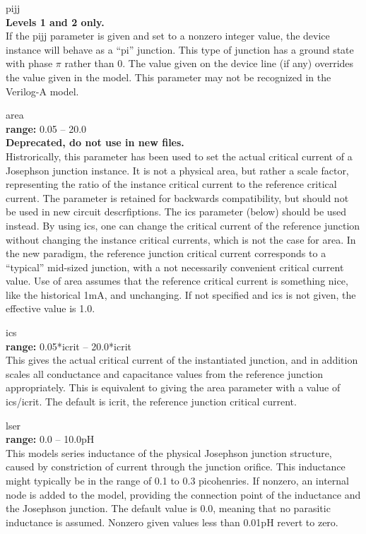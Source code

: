 \begin{description}
\item{\vt pijj}\\
{\bf Levels 1 and 2 only.}\\
If the {\vt pijj} parameter is given and set to a nonzero integer
value, the device instance will behave as a ``pi'' junction.  This
type of junction has a ground state with phase $\pi$ rather than 0. 
The value given on the device line (if any) overrides the value given
in the model.  This parameter may not be recognized in the Verilog-A
model.

\item{\vt area}\\
{\bf range:} 0.05 -- 20.0\\
{\bf Deprecated, do not use in new files.}\\
Histrorically, this parameter has been used to set the actual critical
current of a Josephson junction instance.  It is not a physical area,
but rather a scale factor, representing the ratio of the instance
critical current to the reference critical current.  The parameter is
retained for backwards compatibility, but should not be used in new
circuit descrfiptions.  The {\vt ics} parameter (below) should be used
instead.  By using {\vt ics}, one can change the critical current of
the reference junction without changing the instance critical
currents, which is not the case for {\vt area}.  In the new paradigm,
the reference junction critical current corresponds to a ``typical''
mid-sized junction, with a not necessarily convenient critical current
value.  Use of {\vt area} assumes that the reference critical current
is something nice, like the historical 1mA, and unchanging.  If not
specified and {\vt ics} is not given, the effective value is 1.0.

\item{\vt ics}\\
{\bf range:} 0.05*{\vt icrit} -- 20.0*{\vt icrit}\\
This gives the actual critical current of the instantiated junction,
and in addition scales all conductance and capacitance values from the
reference junction appropriately.  This is equivalent to giving the
{\vt area} parameter with a value of {\vt ics}/{\vt icrit}.  The
default is {\vt icrit}, the reference junction critical current.

\item{\vt lser}\\
{\bf range:} 0.0 -- 10.0pH\\
This models series inductance of the physical Josephson junction
structure, caused by constriction of current through the junction
orifice.  This inductance might typically be in the range of 0.1 to
0.3 picohenries.  If nonzero, an internal node is added to the model,
providing the connection point of the inductance and the Josephson
junction.  The default value is 0.0, meaning that no parasitic
inductance is assumed.  Nonzero given values less than 0.01pH revert
to zero.


\end{description}
